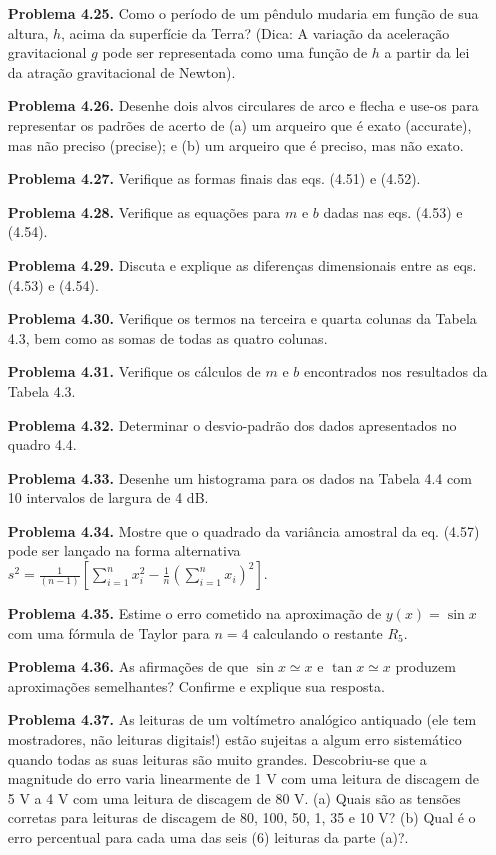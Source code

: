 \begin{enumerate}
    \item[\textbf{Problema 4.25.}] Como o período de um pêndulo mudaria em função de sua altura, $h$, acima da superfície da Terra? (Dica: A variação da aceleração gravitacional $g$ pode ser representada como uma função de $h$ a partir da lei da atração gravitacional de Newton).
    \item[\textbf{Problema 4.26.}] Desenhe dois alvos circulares de arco e flecha e use-os para representar os padrões de acerto de (a) um arqueiro que é exato (accurate), mas não preciso (precise); e (b) um arqueiro que é preciso, mas não exato.
    \item[\textbf{Problema 4.27.}] Verifique as formas finais das eqs. (4.51) e (4.52).
    \item[\textbf{Problema 4.28.}] Verifique as equações para $m$ e $b$ dadas nas eqs. (4.53) e (4.54).
    \item[\textbf{Problema 4.29.}] Discuta e explique as diferenças dimensionais entre as eqs. (4.53) e (4.54).
    \item[\textbf{Problema 4.30.}] Verifique os termos na terceira e quarta colunas da Tabela 4.3, bem como as somas de todas as quatro colunas.
    \item[\textbf{Problema 4.31.}] Verifique os cálculos de $m$ e $b$ encontrados nos resultados da Tabela 4.3.
    \item[\textbf{Problema 4.32.}] Determinar o desvio-padrão dos dados apresentados no quadro 4.4.
    \item[\textbf{Problema 4.33.}] Desenhe um histograma para os dados na Tabela 4.4 com 10 intervalos de largura de 4 dB.
    \item[\textbf{Problema 4.34.}] Mostre que o quadrado da variância amostral da eq. (4.57) pode ser lançado na forma alternativa $s^2 = \frac{1}{(n-1)} \left[ \sum_{i=1}^n x_i^2 - \frac{1}{n} \left(\sum_{i=1}^n x_i\right)^2 \right]$.
    \item[\textbf{Problema 4.35.}] Estime o erro cometido na aproximação de $y(x) = \sin x$ com uma fórmula de Taylor para $n = 4$ calculando o restante $R_5$.
    \item[\textbf{Problema 4.36.}] As afirmações de que $\sin x \simeq x$ e $\tan x \simeq x$ produzem aproximações semelhantes? Confirme e explique sua resposta.
    \item[\textbf{Problema 4.37.}] As leituras de um voltímetro analógico antiquado (ele tem mostradores, não leituras digitais!) estão sujeitas a algum erro sistemático quando todas as suas leituras são muito grandes. Descobriu-se que a magnitude do erro varia linearmente de 1 V com uma leitura de discagem de 5 V a 4 V com uma leitura de discagem de 80 V. (a) Quais são as tensões corretas para leituras de discagem de 80, 100, 50, 1, 35 e 10 V? (b) Qual é o erro percentual para cada uma das seis (6) leituras da parte (a)?.

\end{enumerate}
